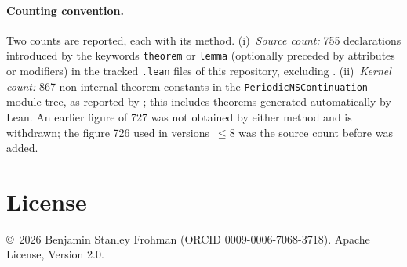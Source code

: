 \documentclass[11pt]{article}
\begin{document}
\paragraph{Counting convention.} Two counts are reported, each with its method. (i)~\emph{Source count:} 755 declarations introduced by the keywords \texttt{theorem} or \texttt{lemma} (optionally preceded by attributes or modifiers) in the tracked \texttt{.lean} files of this repository, excluding . (ii)~\emph{Kernel count:} 867 non-internal theorem constants in the \texttt{PeriodicNSContinuation} module tree, as reported by ; this includes theorems generated automatically by Lean. An earlier figure of 727 was not obtained by either method and is withdrawn; the figure 726 used in versions~$\le$8 was the source count before  was added.

\section*{License}
\copyright\ 2026 Benjamin Stanley Frohman (ORCID 0009-0006-7068-3718). Apache License, Version 2.0.


\end{document}
